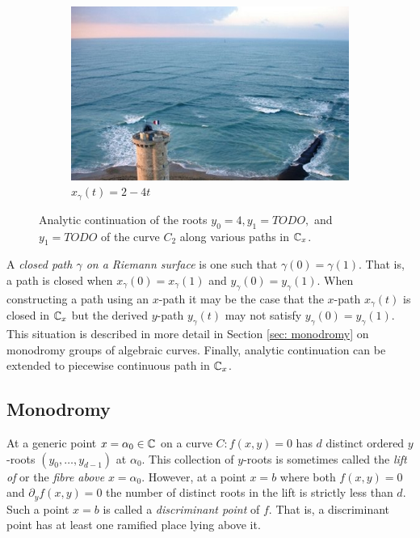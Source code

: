 \begin{example}
\begin{figure}
\begin{subfigure}[b]{0.48\textwidth}
    \includegraphics[draft,width=\textwidth]{images/livekp.jpg}
    \caption{$x_\gamma(t) = 2 - 4t$}
    \label{fig:ancont-c2-line}
  \end{subfigure}
  \caption{Analytic continuation of the roots $y_0 = 4, y_1 = TODO,$ and $y_1 =
    TODO$ of the curve $C_2$ along various paths in $\operatorname{\mathbb{C}}_x$.}
  \label{fig:ancont-c2}
\end{figure}
\end{example}

A {\it closed path $\gamma$ on a Riemann surface} is one such that $\gamma(0) =
\gamma(1)$. That is, a path is closed when $x_\gamma(0) = x_\gamma(1)$ and
$y_\gamma(0) = y_\gamma(1)$. When constructing a path using an $x$-path it may
be the case that the $x$-path $x_\gamma(t)$ is closed in $\operatorname{\mathbb{C}}_x$ but the derived
$y$-path $y_\gamma(t)$ may not satisfy $y_\gamma(0) = y_\gamma(1)$. This
situation is described in more detail in Section \ref{sec: monodromy} on
monodromy groups of algebraic curves. Finally, analytic continuation can be
extended to piecewise continuous path in $\operatorname{\mathbb{C}}_x$.


\subsection{Monodromy}\label{subsec:background-monodromy}

At a generic point $x = \alpha_0 \in \operatorname{\mathbb{C}}$ on a curve $C : f(x,y) = 0$ has $d$
distinct ordered $y$-roots $(y_0,\ldots,y_{d-1})$ at $\alpha_0$. This collection
of $y$-roots is sometimes called the {\it lift of} or the {\it fibre above}
$x=\alpha_0$. However, at a point $x=b$ where both $f(x,y) = 0$ and $\partial_y
f(x,y) = 0$ the number of distinct roots in the lift is strictly less than $d$.
Such a point $x = b$ is called a {\it discriminant point} of $f$. That is, a
discriminant point has at least one ramified place lying above it.

